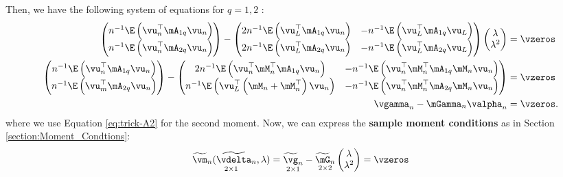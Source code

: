 Then, we have the following system of equations for $q = 1, 2$ \citep[see][pag 56]{kelejian2010specification}:
\begin{equation}\label{eq:system-gmm-general}
\begin{aligned}
  \begin{pmatrix}
    n^{-1}\E\left(\vu^\top_n\mA_{1q}\vu_n \right)  \\
    n^{-1}\E\left(\vu^\top_n\mA_{2q}\vu_n \right) 
  \end{pmatrix} -
  \begin{pmatrix}
    2n^{-1}\E\left(\vu_L^\top\mA_{1q}\vu_n\right) &   -n^{-1}\E\left(\vu_L^\top\mA_{1q}\vu_L\right)   \\
    2n^{-1}\E\left(\vu_L^\top\mA_{2q}\vu_n\right) &   -n^{-1}\E\left(\vu_L^\top\mA_{2q}\vu_L\right)
  \end{pmatrix}
  \begin{pmatrix}
  \lambda \\
  \lambda^2
  \end{pmatrix}
  & = \vzeros \\
    \begin{pmatrix}
    n^{-1}\E\left(\vu^\top_n\mA_{1q}\vu_n \right)   \\
    n^{-1}\E\left(\vu^\top_m\mA_{2q}\vu_n \right) 
  \end{pmatrix}-
  \begin{pmatrix}
    2n^{-1}\E\left(\vu^\top_n\mM^\top_n\mA_{1q}\vu_n\right) &   -n^{-1}\E\left(\vu^\top_n\mM^\top_n\mA_{1q}\mM_n\vu_n\right)   \\
    n^{-1}\E\left(\vu_L^\top\left(\mM_n + \mM^\top_n\right)\vu_n\right) &   -n^{-1}\E\left(\vu^\top_n\mM^\top_n\mA_{2q}\mM_n\vu_n\right)
  \end{pmatrix} & = \vzeros \\
  \vgamma_n - \mGamma_n\valpha_n &= \vzeros. 
\end{aligned}
\end{equation}
%
where we use Equation \eqref{eq:trick-A2} for the second moment. Now, we can express the \textbf{sample moment conditions} as in Section \ref{section:Moment_Condtions}:
\begin{equation*}
	\underset{2 \times 1}{\widetilde{\vm}_n(\widetilde{\vdelta}_n, \lambda)} = \underset{2 \times 1}{\widetilde{\vg}_n} - \underset{2 \times 2}{\widetilde{\mG}_n}\begin{pmatrix}\lambda \\ \lambda^2\end{pmatrix} = \vzeros
\end{equation*}

